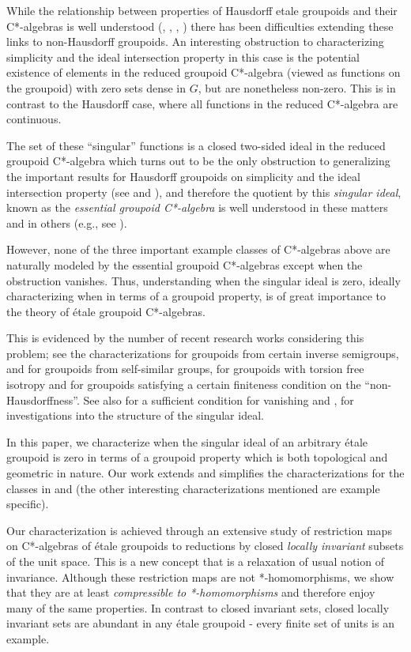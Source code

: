 \documentclass[a4paper, 12pt]{amsart}
\theoremstyle{definition}
\theoremstyle{remark}
\numberwithin{equation}{section}
\begin{document}
While the relationship between properties of Hausdorff etale groupoids and their C*-algebras is well understood (\cite{DR00}, \cite{T99}, \cite{D97}, \cite{BCFS14}) there has been difficulties extending these links to non-Hausdorff groupoids. An interesting obstruction to characterizing simplicity and the ideal intersection property in this case is the potential existence of elements in the reduced groupoid C*-algebra (viewed as functions on the groupoid) with zero sets dense in $G$, but are nonetheless non-zero. This is in contrast to the Hausdorff case, where all functions in the reduced C*-algebra are continuous. 

The set of these ``singular'' functions is a closed two-sided ideal in the reduced groupoid C*-algebra which turns out to be the only obstruction to generalizing the important results for Hausdorff groupoids on simplicity and the ideal intersection property (see \cite{CEPSS19} and \cite{KKLRU21}), and therefore the quotient by this \emph{singular ideal}, known as the \emph{essential groupoid C*-algebra} is well understood in these matters and in others (e.g., see \cite{EP22}).

However, none of the three important example classes of C*-algebras above are naturally modeled by the essential groupoid C*-algebras except when the obstruction vanishes. Thus, understanding when the singular ideal is zero, ideally characterizing when in terms of a groupoid property, is of great importance to the theory of \'etale groupoid C*-algebras. 

This is evidenced by the number of recent research works considering this problem; see the characterizations \cite{SS20} for groupoids from certain inverse semigroups, \cite{SS24} and \cite{GNSV25} for groupoids from self-similar groups, \cite{NS23} for groupoids with torsion free isotropy and \cite{BGHL25} for groupoids satisfying a certain finiteness condition on the ``non-Hausdorffness''. See also \cite{CEPSS19} for a sufficient condition for vanishing and \cite{CN24}, \cite{ACJM25} for investigations into the structure of the singular ideal. 

In this paper, we characterize when the singular ideal of an arbitrary \'etale groupoid is zero in terms of a groupoid property which is both topological and geometric in nature. Our work extends and simplifies the characterizations for the classes in \cite{NS23} and \cite{BGHL25} (the other interesting characterizations mentioned are example specific). 

Our characterization is achieved through an extensive study of restriction maps on C*-algebras of \'etale groupoids to reductions by closed \emph{locally invariant} subsets of the unit space. This is a new concept that is a relaxation of usual notion of invariance. Although these restriction maps are not *-homomorphisms, we show that they are at least \emph{compressible to *-homomorphisms} and therefore enjoy many of the same properties. In contrast to closed invariant sets, closed locally invariant sets are abundant in any \'etale groupoid - every finite set of units is an example.
\end{document}
